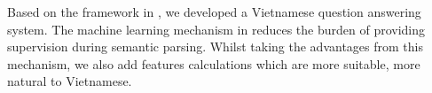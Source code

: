 Based on the framework in \cite{Clarke:2010:DSP:1870568.1870571}, we developed a Vietnamese question answering system. The machine learning mechanism in \cite{Clarke:2010:DSP:1870568.1870571} reduces the burden of providing supervision during semantic parsing. Whilst taking the advantages from this mechanism, we also add features calculations which are more suitable, more natural to Vietnamese.